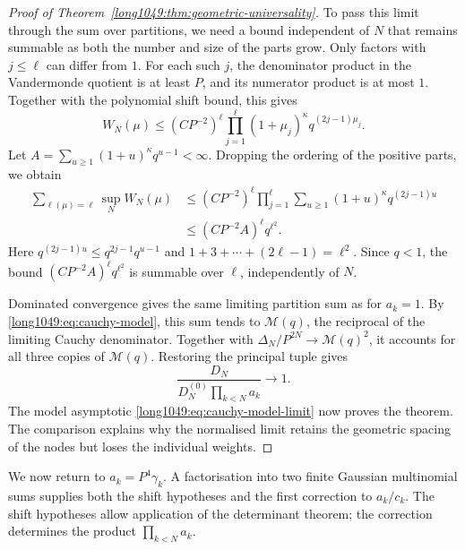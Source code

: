 \documentclass[11pt]{article}
\begin{document}
\begin{proof}[Proof of Theorem~\ref{long1049:thm:geometric-universality}]
To pass this limit through the sum over partitions, we need a bound
independent of $N$ that remains summable as both the number and size
of the parts grow. Only factors with $j\le\ell$ can differ from $1$.
For each such $j$, the denominator product in the Vandermonde
quotient is at least $P$, and its numerator product is at most $1$.
Together with the polynomial shift bound, this gives
\[
 W_N(\mu)\le(CP^{-2})^\ell
 \prod_{j=1}^\ell(1+\mu_j)^\kappa q^{(2j-1)\mu_j}.
\]
Let $A=\sum_{u\ge1}(1+u)^\kappa q^{u-1}<\infty$.
Dropping the ordering of the positive parts, we obtain
\begin{align*}
 \sum_{\ell(\mu)=\ell}\sup_N W_N(\mu)
 &\le(CP^{-2})^\ell\prod_{j=1}^\ell
       \sum_{u\ge1}(1+u)^\kappa q^{(2j-1)u}\\
 &\le(CP^{-2}A)^\ell q^{\ell^2}.
\end{align*}
Here $q^{(2j-1)u}\le q^{2j-1}q^{u-1}$ and
$1+3+\cdots+(2\ell-1)=\ell^2$. Since $q<1$, the bound
$(CP^{-2}A)^\ell q^{\ell^2}$ is summable over $\ell$,
independently of $N$.

Dominated convergence gives the same limiting partition sum as
for $a_k=1$. By \eqref{long1049:eq:cauchy-model}, this sum tends
to $\mathcal M(q)$, the reciprocal of the limiting Cauchy
denominator. Together with $\Delta_N/P^{2N}\to\mathcal M(q)^2$,
it accounts for all three copies of $\mathcal M(q)$. Restoring
the principal tuple gives
\[
 \frac{D_N}{D_N^{(0)}\prod_{k<N}a_k}\longrightarrow1.
\]
The model asymptotic \eqref{long1049:eq:cauchy-model-limit} now proves
the theorem. The comparison explains why the normalised limit
retains the geometric spacing of the nodes but loses the individual
weights.
\end{proof}

We now return to $a_k=P^4\gamma_k$. A factorisation into two
finite Gaussian multinomial sums supplies both the shift hypotheses
and the first correction to $a_k/c_k$. The shift hypotheses allow
application of the determinant theorem; the correction determines
the product $\prod_{k<N}a_k$.
\end{document}
